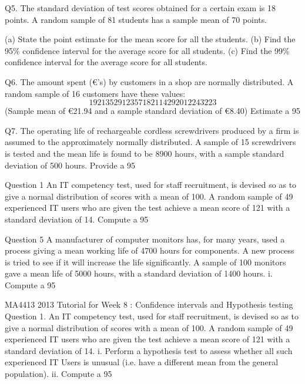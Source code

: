 \newpage
Q5. The standard deviation of test scores obtained for a certain exam is 18 points. 
A random sample of 81 students has a sample mean of 70 points.

(a) State the point estimate for the mean score for all the students.
(b) Find the 95\% confidence interval for the average score for all students.
(c) Find the 99\% confidence interval for the average score for all students.

Q6. The amount spent (€’s) by customers in a shop are normally distributed. 
A random sample of 16 customers have these values:
\[19 21 35 29 12 35 7 18 21 14 29 20 12 24 32 23\]
(Sample  mean of €21.94 and a sample standard deviation of €8.40) 
Estimate a 95%

Q7. The operating life of rechargeable cordless screwdrivers produced by a firm is assumed to 
the approximately normally distributed. A sample of 15 screwdrivers is tested and the mean 
life is found to be 8900 hours, with a sample standard deviation of 500 hours. 
Provide a 95%


Question 1 
An IT competency test, used for staff recruitment, is devised so as to give a normal distribution of scores with a mean of 100. A random sample of 49 experienced IT users who are given the test achieve a mean score of 121 with a standard deviation of 14. 
Compute a 95%

\newpage

Question 5
A manufacturer of computer monitors  has, for many years, used a process giving a mean  working life of 4700 hours  for components.
A new process is tried to see if it will increase the life significantly. A sample of 100 monitors gave a mean life of 5000 hours, with a standard deviation of 1400 hours.
i.	Compute a 95%



\newpage

MA4413 2013 Tutorial for Week 8 : Confidence intervals and Hypothesis testing
Question 1. 
An IT competency test, used for staff recruitment, is devised so as to give a normal distribution of scores with a mean of 100. A random sample of 49 experienced IT users who are given the test achieve a mean score of 121 with a standard deviation of 14. 
i.	Perform a hypothesis test to assess whether all such experienced IT Users is unusual (i.e. have a different mean from the general population).
ii.	Compute a 95%

